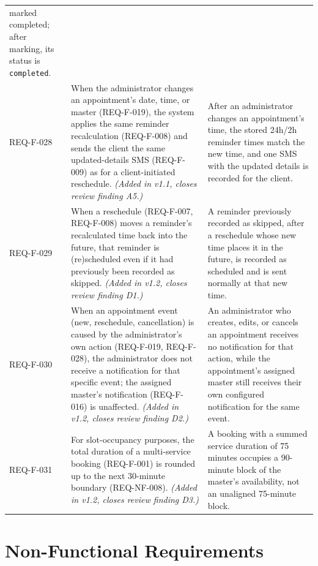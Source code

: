 \documentclass[11pt,a4paper]{article}
\begin{document}
\begin{longtable}{L{1.9cm}L{6.4cm}L{6.2cm}}
  marked completed; after marking, its status is \texttt{completed}. \\
REQ-F-028 & When the administrator changes an appointment's date, time, or
  master (REQ-F-019), the system applies the same reminder recalculation
  (REQ-F-008) and sends the client the same updated-details SMS
  (REQ-F-009) as for a client-initiated reschedule. \emph{(Added in v1.1,
  closes review finding A5.)} & After an administrator changes an
  appointment's time, the stored 24h/2h reminder times match the new time,
  and one SMS with the updated details is recorded for the client. \\
REQ-F-029 & When a reschedule (REQ-F-007, REQ-F-008) moves a reminder's
  recalculated time back into the future, that reminder is (re)scheduled
  even if it had previously been recorded as skipped. \emph{(Added in
  v1.2, closes review finding D1.)} & A reminder previously recorded as
  skipped, after a reschedule whose new time places it in the future, is
  recorded as scheduled and is sent normally at that new time. \\
REQ-F-030 & When an appointment event (new, reschedule, cancellation) is
  caused by the administrator's own action (REQ-F-019, REQ-F-028), the
  administrator does not receive a notification for that specific event;
  the assigned master's notification (REQ-F-016) is unaffected.
  \emph{(Added in v1.2, closes review finding D2.)} & An administrator who
  creates, edits, or cancels an appointment receives no notification for
  that action, while the appointment's assigned master still receives
  their own configured notification for the same event. \\
REQ-F-031 & For slot-occupancy purposes, the total duration of a
  multi-service booking (REQ-F-001) is rounded up to the next 30-minute
  boundary (REQ-NF-008). \emph{(Added in v1.2, closes review finding D3.)}
  & A booking with a summed service duration of 75 minutes occupies a
  90-minute block of the master's availability, not an unaligned
  75-minute block. \\
\bottomrule
\end{longtable}

\section{Non-Functional Requirements}
\label{sec:nonfunctional}
\end{document}
